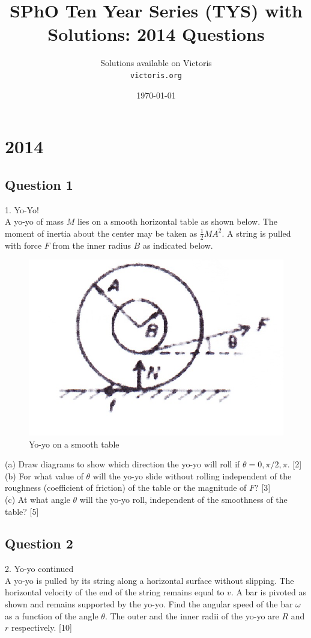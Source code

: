 \documentclass{article}
\title{SPhO Ten Year Series (TYS) with Solutions: 2014 Questions}
\author{
    Solutions available on Victoris\\
    \texttt{victoris.org}
}
\date{\today}
\begin{document}
\maketitle

\section{2014}
\subsection{Question 1}
1. Yo-Yo! \\ A yo-yo of mass $M$ lies on a smooth horizontal table as shown below. The moment of inertia about the center may be taken as $\frac{1}{2} M A^{2} .$ A string is pulled with force $F$ from the inner radius $B$ as indicated below.

\begin{figure}
	\centering
	\includegraphics[width=0.5\linewidth]{spho_book_TYS_images/2014q1.png}
	\caption{Yo-yo on a smooth table}
\end{figure}

(a) Draw diagrams to show which direction the yo-yo will roll if $\theta=0, \pi / 2, \pi .$ [2] \\
(b) For what value of $\theta$ will the yo-yo slide without rolling independent of the roughness (coefficient of friction) of the table or the magnitude of $F$? [3] \\
(c) At what angle $\theta$ will the yo-yo roll, independent of the smoothness of the table? [5]

\subsection{Question 2}
2. Yo-yo continued \\ A yo-yo is pulled by its string along a horizontal surface without slipping. The horizontal velocity of the end of the string remains equal to $v .$ A bar is pivoted as shown and remains supported by the yo-yo. Find the angular speed of the bar $\omega$ as a function of the angle $\theta$. The outer and the inner radii of the yo-yo are $R$ and $r$ respectively. [10]
\end{document}
